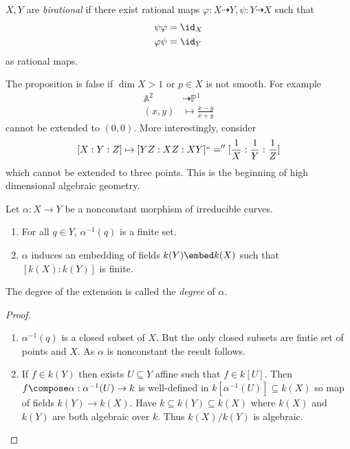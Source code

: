 \documentclass[a4paper]{article}
\renewcommand{\A}{\mathbb{A}}
\renewcommand*{\P}{\mathbb{P}}
\newcommand{\rational}{\dashrightarrow} %
\begin{document}
\begin{definition}
  \(X, Y\) are \emph{birational} if there exist rational maps \(\varphi: X \rational Y, \psi: Y \rational X\) such that
  \begin{align*}
    \psi \varphi &= \id_X \\
    \varphi \psi &= \id_Y
  \end{align*}
  as rational maps.
\end{definition}

\begin{remark}
  The proposition is false if \(\dim X > 1\) or \(p \in X\) is not smooth. For example
  \begin{align*}
    \A^2 &\rational \P^1 \\
    (x, y) &\mapsto \frac{x - y}{x + y}
  \end{align*}
  cannot be extended to \((0, 0)\). More interestingly, consider
  \[
    [X: Y: Z] \mapsto [YZ: XZ: XY] ``='' [\frac{1}{X} : \frac{1}{Y}: \frac{1}{Z}]
  \]
  which cannot be extended to three points. This is the beginning of high dimensional algebraic geometry.
\end{remark}

\begin{proposition}
  Let \(\alpha: X \to Y\) be a nonconstant morphism of irreducible curves.
  \begin{enumerate}
  \item For all \(q \in Y\), \(\alpha^{-1}(q)\) is a finite set.
  \item \(\alpha\) induces an embedding of fields \(k(Y) \embed k(X)\) such that \([k(X): k(Y)]\) is finite.
  \end{enumerate}
\end{proposition}

\begin{definition}[degree]
  The degree of the extension is called the \emph{degree} of \(\alpha\).
\end{definition}

\begin{proof}\leavevmode
  \begin{enumerate}
  \item \(\alpha^{-1}(q)\) is a closed subset of \(X\). But the only closed subsets are fintie set of points and \(X\). As \(\alpha\) is nonconstant the result follows.
  \item If \(f \in k(Y)\) then exists \(U \subseteq Y\) affine such that \(f \in k[U]\). Then \(f \compose \alpha: \alpha^{-1}(U) \to k\) is well-defined in \(k[\alpha^{-1}(U)] \subseteq k(X)\) so map of fields \(k(Y) \to k(X)\). Have \(k \subseteq k(Y) \subseteq k(X)\) where \(k(X)\) and \(k(Y)\) are both algebraic over \(k\). Thus \(k(X)/k(Y)\) is algebraic.
  \end{enumerate}
\end{proof}
\end{document}
